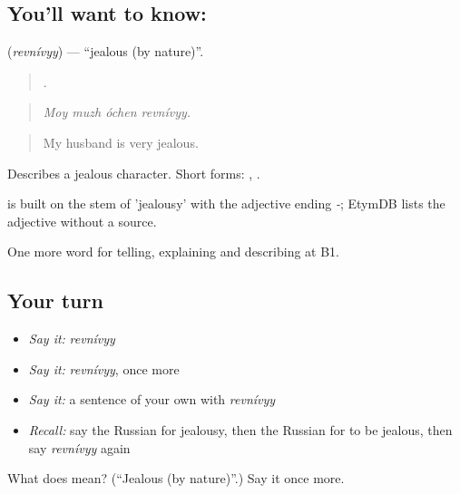 \subsection*{You'll want to know: }
\textbf{} (\emph{revnívyy}) — \textquotedblleft{}jealous (by nature)\textquotedblright{}.

\begin{quote}
   .
\end{quote}

\begin{quote}
\emph{Moy muzh óchen revnívyy.}
\end{quote}

\begin{quote}
My husband is very jealous.
\end{quote}

Describes a jealous character. Short forms: , .

\begin{cousinweb}
\emph{} is built on the stem of \emph{} 'jealousy' with the adjective ending \emph{-}; EtymDB lists the adjective without a source.
\end{cousinweb}

\begin{grammarlens}[title={What you've built}]
One more word for telling, explaining and describing at B1.
\end{grammarlens}

\subsection*{Your turn}
\begin{itemize}
\raggedright
  \item \emph{Say it:} \emph{revnívyy}
  \item \emph{Say it:} \emph{revnívyy}, once more
  \item \emph{Say it:} a sentence of your own with \emph{revnívyy}
  \item \emph{Recall:} say the Russian for jealousy, then the Russian for to be jealous, then say \emph{revnívyy} again
\end{itemize}

\begin{tcolorbox}[breakable,colback=teal!4,colframe=teal!35!black,title={Before you move on}]
What does  mean? (\textquotedblleft{}Jealous (by nature)\textquotedblright{}.) Say it once more.
\end{tcolorbox}
